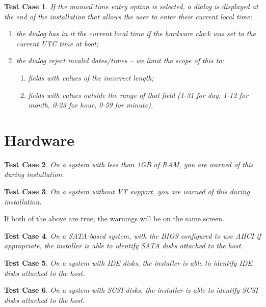\documentclass[a4paper]{article}
\newtheorem{testcase}{Test Case}
\begin{document}
\begin{testcase}
If the manual time entry option is selected, a dialog is displayed at
the end of the installation that allows the user to enter their
current local time:
\begin{enumerate}
\item the dialog has in it the current local time if the hardware
  clock was set to the current UTC time at boot;
\item the dialog reject invalid dates/times -- we limit the scope of
  this to:
  \begin{enumerate}
  \item fields with values of the incorrect length;
  \item fields with values outside the range of that field (1-31 for
  day, 1-12 for month, 0-23 for hour, 0-59 for minute).
  \end{enumerate}
\end{enumerate}
\end{testcase}

\section{Hardware}

\begin{testcase}
On a system with less than 1GB of RAM, you are warned of this during
installation.
\end{testcase}

\begin{testcase}
On a system without VT support, you are warned of this during
installation.
\end{testcase}

If both of the above are true, the warnings will be on the same
screen.

\begin{testcase}
On a SATA-based system, with the BIOS configured to use AHCI if
appropriate, the installer is able to identify SATA disks attached to
the host.
\end{testcase}

\begin{testcase}
On a system with IDE disks, the installer is able to identify IDE
disks attached to the host.
\end{testcase}

\begin{testcase}
On a system with SCSI disks, the installer is able to identify SCSI
disks attached to the host.
\end{testcase}
\end{document}
